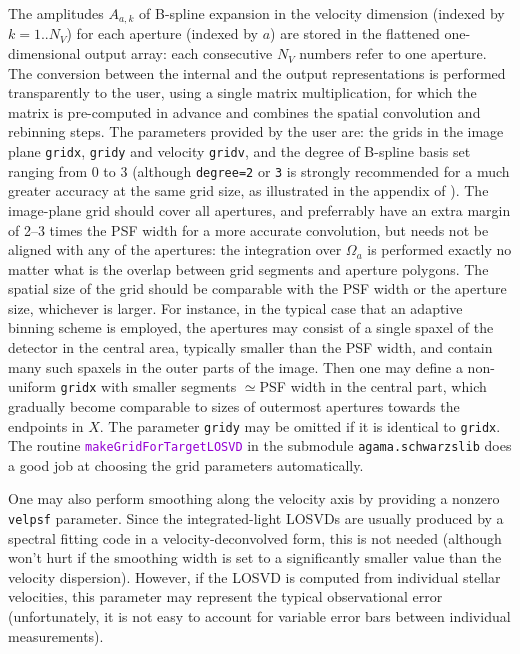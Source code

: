 \documentclass[12pt]{article}
\newcommand{\ttt}[1]{\textcolor{darkviolet}{\texttt{#1}}}
\newcommand{\ppp}[1]{\textcolor{darkolive} {\texttt{#1}}}
\begin{document}
The amplitudes $A_{a,k}$ of B-spline expansion in the velocity dimension (indexed by $k=1..N_V$) for each aperture (indexed by $a$) are stored in the flattened one-dimensional output array: each consecutive $N_V$ numbers refer to one aperture. The conversion between the internal and the output representations is performed transparently to the user, using a single matrix multiplication, for which the matrix is pre-computed in advance and combines the spatial convolution and rebinning steps. The parameters provided by the user are: the grids in the image plane \ppp{gridx}, \ppp{gridy} and velocity \ppp{gridv}, and the degree of B-spline basis set ranging from 0 to 3 (although \ppp{degree=2} or \ppp{3} is strongly recommended for a much greater accuracy at the same grid size, as illustrated in the appendix of \cite{VasilievValluri2020}). The image-plane grid should cover all apertures, and preferrably have an extra margin of 2--3 times the PSF width for a more accurate convolution, but needs not be aligned with any of the apertures: the integration over $\Omega_a$ is performed exactly no matter what is the overlap between grid segments and aperture polygons. The spatial size of the grid should be comparable with the PSF width or the aperture size, whichever is larger. For instance, in the typical case that an adaptive binning scheme is employed, the apertures may consist of a single spaxel of the detector in the central area, typically smaller than the PSF width, and contain many such spaxels in the outer parts of the image. Then one may define a non-uniform \ppp{gridx} with smaller segments $\simeq$PSF width in the central part, which gradually become comparable to sizes of outermost apertures towards the endpoints in $X$. The parameter \ppp{gridy} may be omitted if it is identical to \ppp{gridx}. The routine \ttt{makeGridForTargetLOSVD} in the submodule \texttt{agama.schwarzslib} does a good job at choosing the grid parameters automatically.

One may also perform smoothing along the velocity axis by providing a nonzero \ppp{velpsf} parameter. Since the integrated-light LOSVDs  are usually produced by a spectral fitting code in a velocity-deconvolved form, this is not needed (although won't hurt if the smoothing width is set to a significantly smaller value than the velocity dispersion). However, if the LOSVD is computed from individual stellar velocities, this parameter may represent the typical observational error (unfortunately, it is not easy to account for variable error bars between individual measurements).
\end{document}
